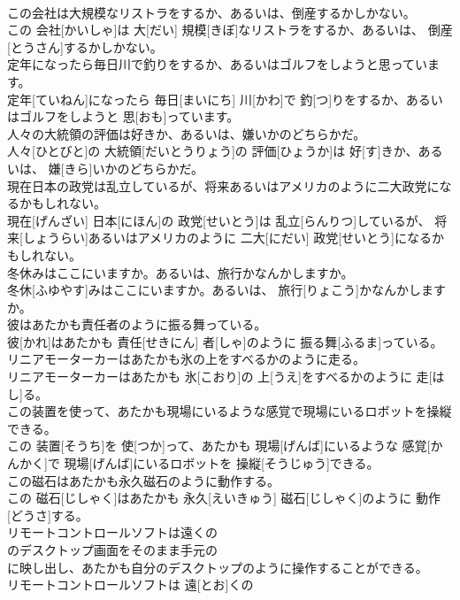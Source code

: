 \documentclass[8pt]{extreport}
\begin{document}
\begin{CJK}{UTF8}{min}
\\	この会社は大規模なリストラをするか、あるいは、倒産するかしかない。	
\\	この 会社[かいしゃ]は 大[だい] 規模[きぼ]なリストラをするか、あるいは、 倒産[とうさん]するかしかない。
\\	定年になったら毎日川で釣りをするか、あるいはゴルフをしようと思っています。	
\\	定年[ていねん]になったら 毎日[まいにち] 川[かわ]で 釣[つ]りをするか、あるいはゴルフをしようと 思[おも]っています。
\\	人々の大統領の評価は好きか、あるいは、嫌いかのどちらかだ。	
\\	人々[ひとびと]の 大統領[だいとうりょう]の 評価[ひょうか]は 好[す]きか、あるいは、 嫌[きら]いかのどちらかだ。
\\	現在日本の政党は乱立しているが、将来あるいはアメリカのように二大政党になるかもしれない。	
\\	現在[げんざい] 日本[にほん]の 政党[せいとう]は 乱立[らんりつ]しているが、 将来[しょうらい]あるいはアメリカのように 二大[にだい] 政党[せいとう]になるかもしれない。
\\	冬休みはここにいますか。あるいは、旅行かなんかしますか。	
\\	冬休[ふゆやす]みはここにいますか。あるいは、 旅行[りょこう]かなんかしますか。
\\	彼はあたかも責任者のように振る舞っている。	
\\	彼[かれ]はあたかも 責任[せきにん] 者[しゃ]のように 振る舞[ふるま]っている。
\\	リニアモーターカーはあたかも氷の上をすべるかのように走る。	
\\	リニアモーターカーはあたかも 氷[こおり]の 上[うえ]をすべるかのように 走[はし]る。
\\	この装置を使って、あたかも現場にいるような感覚で現場にいるロボットを操縦できる。	
\\	この 装置[そうち]を 使[つか]って、あたかも 現場[げんば]にいるような 感覚[かんかく]で 現場[げんば]にいるロボットを 操縦[そうじゅう]できる。
\\	この磁石はあたかも永久磁石のように動作する。	
\\	この 磁石[じしゃく]はあたかも 永久[えいきゅう] 磁石[じしゃく]のように 動作[どうさ]する。
\\	リモートコントロールソフトは遠くの
\\	のデスクトップ画面をそのまま手元の
\\	に映し出し、あたかも自分のデスクトップのように操作することができる。	
\\	リモートコントロールソフトは 遠[とお]くの 

\end{CJK}
\end{document}
